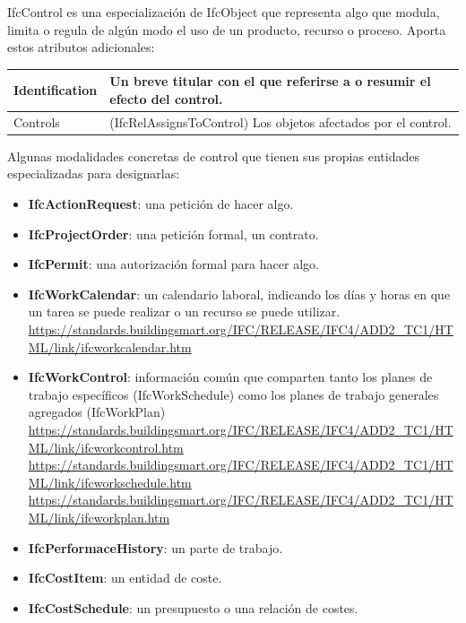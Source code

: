\documentclass[spanish,12pt,a4paper,final,oneside]{book}
\begin{document}
IfcControl es una especialización de IfcObject que representa algo que modula, limita o regula de algún modo el uso de un producto, recurso o proceso. Aporta estos atributos adicionales:

\begin{longtable}{|p{2.5cm} p{11cm}|}
\hline
Identification & Un breve titular con el que referirse a o resumir el efecto del control.
\\[0.1cm] \hline
Controls & (IfcRelAssignsToControl) Los objetos afectados por el control.
\\[0.1cm] \hline

\end{longtable}

\vspace{0.3cm}
Algunas modalidades concretas de control que tienen sus propias entidades especializadas para designarlas:
\begin{itemize}
\item \textbf{IfcActionRequest}: una petición de hacer algo.
\item \textbf{IfcProjectOrder}: una petición formal, un contrato.
\item \textbf{IfcPermit}: una autorización formal para hacer algo.

\item \textbf{IfcWorkCalendar}: un calendario laboral, indicando los días y horas en que un tarea se puede realizar o un recurso se puede utilizar.
\\ \url{https://standards.buildingsmart.org/IFC/RELEASE/IFC4/ADD2_TC1/HTML/link/ifcworkcalendar.htm}

\item \textbf{IfcWorkControl}: información común que comparten tanto los planes de trabajo específicos (IfcWorkSchedule) como los planes de trabajo generales agregados (IfcWorkPlan)
\\ \url{https://standards.buildingsmart.org/IFC/RELEASE/IFC4/ADD2_TC1/HTML/link/ifcworkcontrol.htm}
\\ \url{https://standards.buildingsmart.org/IFC/RELEASE/IFC4/ADD2_TC1/HTML/link/ifcworkschedule.htm}
\\ \url{https://standards.buildingsmart.org/IFC/RELEASE/IFC4/ADD2_TC1/HTML/link/ifcworkplan.htm}

\item \textbf{IfcPerformaceHistory}: un parte de trabajo.
\item \textbf{IfcCostItem}: un entidad de coste.
\item \textbf{IfcCostSchedule}: un presupuesto o una relación de costes.
\end{itemize}
\end{document}
